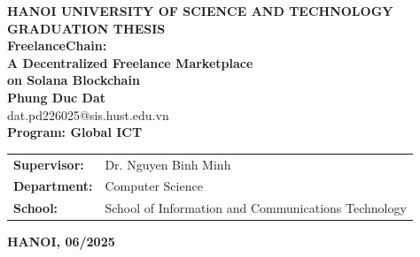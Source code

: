 \begin{titlepage}
\thispagestyle{empty}
\begin{center}

{\large \textbf{HANOI UNIVERSITY OF SCIENCE AND TECHNOLOGY}}\\[4cm]

{\huge \textbf{GRADUATION THESIS}}\\[1.5cm]

{\Large \textbf{FreelanceChain:\\[0.2cm] 
A Decentralized Freelance Marketplace\\[0.2cm]
on Solana Blockchain}}\\[1.5cm]

{\large \textbf{Phung Duc Dat}}\\
{\large dat.pd226025@sis.hust.edu.vn}\\[0.8cm]

{\large \textbf{Program: Global ICT}}

\vfill 

\begin{table}[H]
\centering
\begin{tabular}{ll}
 \textbf{Supervisor:} & Dr. Nguyen Binh Minh \\[0.4cm]
 \textbf{Department:} & Computer Science \\[0.4cm]
 \textbf{School:} & School of Information and Communications Technology \\
\end{tabular}
\end{table}

\vspace{1.5cm}
{\large \textbf{HANOI, 06/2025}}

\end{center}
\end{titlepage}